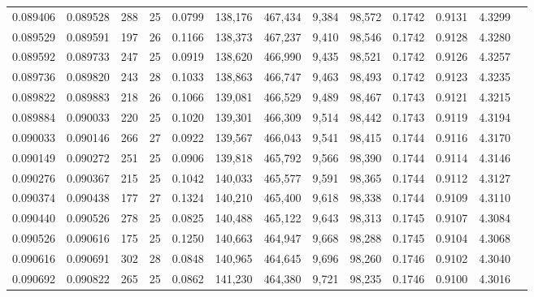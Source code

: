 \begin{tabular}{rrrrrrrrrrrrr}
0.089406 & 0.089528 & 288 &  25 &                                     0.0799 & 138,176 & 467,434 &   9,384 &  98,572 & 0.1742 & 0.9131 & 4.3299 \\
0.089529 & 0.089591 & 197 &  26 &                                     0.1166 & 138,373 & 467,237 &   9,410 &  98,546 & 0.1742 & 0.9128 & 4.3280 \\
0.089592 & 0.089733 & 247 &  25 &                                     0.0919 & 138,620 & 466,990 &   9,435 &  98,521 & 0.1742 & 0.9126 & 4.3257 \\
0.089736 & 0.089820 & 243 &  28 &                                     0.1033 & 138,863 & 466,747 &   9,463 &  98,493 & 0.1742 & 0.9123 & 4.3235 \\
0.089822 & 0.089883 & 218 &  26 &                                     0.1066 & 139,081 & 466,529 &   9,489 &  98,467 & 0.1743 & 0.9121 & 4.3215 \\
0.089884 & 0.090033 & 220 &  25 &                                     0.1020 & 139,301 & 466,309 &   9,514 &  98,442 & 0.1743 & 0.9119 & 4.3194 \\
0.090033 & 0.090146 & 266 &  27 &                                     0.0922 & 139,567 & 466,043 &   9,541 &  98,415 & 0.1744 & 0.9116 & 4.3170 \\
0.090149 & 0.090272 & 251 &  25 &                                     0.0906 & 139,818 & 465,792 &   9,566 &  98,390 & 0.1744 & 0.9114 & 4.3146 \\
0.090276 & 0.090367 & 215 &  25 &                                     0.1042 & 140,033 & 465,577 &   9,591 &  98,365 & 0.1744 & 0.9112 & 4.3127 \\
0.090374 & 0.090438 & 177 &  27 &                                     0.1324 & 140,210 & 465,400 &   9,618 &  98,338 & 0.1744 & 0.9109 & 4.3110 \\
0.090440 & 0.090526 & 278 &  25 &                                     0.0825 & 140,488 & 465,122 &   9,643 &  98,313 & 0.1745 & 0.9107 & 4.3084 \\
0.090526 & 0.090616 & 175 &  25 &                                     0.1250 & 140,663 & 464,947 &   9,668 &  98,288 & 0.1745 & 0.9104 & 4.3068 \\
0.090616 & 0.090691 & 302 &  28 &                                     0.0848 & 140,965 & 464,645 &   9,696 &  98,260 & 0.1746 & 0.9102 & 4.3040 \\
0.090692 & 0.090822 & 265 &  25 &                                     0.0862 & 141,230 & 464,380 &   9,721 &  98,235 & 0.1746 & 0.9100 & 4.3016 \\

\end{tabular}
